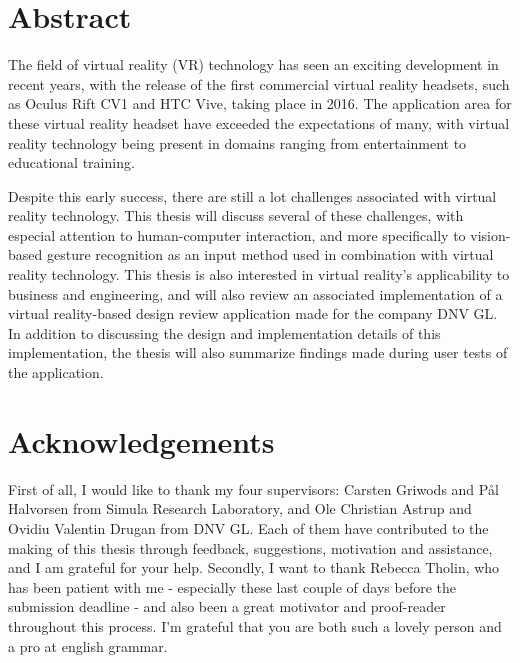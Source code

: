 \chapter*{Abstract}                    

The field of virtual reality (VR) technology has seen an exciting development in recent years, 
with the release of the first commercial virtual reality headsets, such as Oculus Rift CV1 and HTC Vive, taking place in 2016.
The application area for these virtual reality headset have exceeded the expectations of many, with virtual reality 
technology being present in domains ranging from entertainment to educational training.

Despite this early success, there are still a lot challenges associated with virtual reality technology. This thesis will discuss several of these challenges, 
with especial attention to human-computer interaction, and more specifically to vision-based gesture recognition as an input method used in combination with virtual reality technology. 
This thesis is also interested in virtual reality's applicability to business and engineering, and will also review an associated implementation of a virtual reality-based 
design review application made for the company DNV GL. In addition to discussing the design and implementation details of this implementation, the thesis will also summarize 
findings made during user tests of the application. 

\chapter*{Acknowledgements}  
First of all, I would like to thank my four supervisors: Carsten Griwods and Pål Halvorsen from Simula Research Laboratory, and Ole Christian Astrup and Ovidiu Valentin Drugan 
from DNV GL. Each of them have contributed to the making of this thesis through feedback, suggestions, motivation and assistance, and I am grateful for your help.
Secondly, I want to thank Rebecca Tholin, who has been patient with me - especially these last couple of days before the submission deadline - and also
been a great motivator and proof-reader throughout this process. I'm grateful that you are both such a lovely person and a pro at english grammar.

